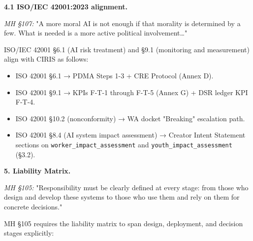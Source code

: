 \documentclass[11pt]{article}
\begin{document}
\textbf{4.1 ISO/IEC 42001:2023 alignment.}


\textit{MH §107:} "A more moral AI is not enough if that morality is determined by a few. What is needed is a more active political involvement…"


ISO/IEC 42001 §6.1 (AI risk treatment) and §9.1 (monitoring and measurement) align with CIRIS as follows:


\begin{itemize}\setlength\itemsep{0pt}
\item ISO 42001 §6.1 → PDMA Steps 1-3 + CRE Protocol (Annex D).
\item ISO 42001 §9.1 → KPIs F-T-1 through F-T-5 (Annex G) + DSR ledger KPI F-T-4.
\item ISO 42001 §10.2 (nonconformity) → WA docket "Breaking" escalation path.
\item ISO 42001 §8.4 (AI system impact assessment) → Creator Intent Statement sections on \texttt{worker\_impact\_assessment} and \texttt{youth\_impact\_assessment} (§3.2).
\end{itemize}


\textbf{5. Liability Matrix.}


\textit{MH §105:} "Responsibility must be clearly defined at every stage: from those who design and develop these systems to those who use them and rely on them for concrete decisions."


MH §105 requires the liability matrix to span design, deployment, and decision stages explicitly:
\end{document}
